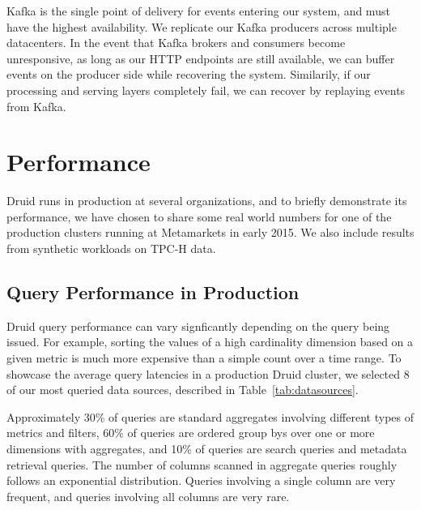 \documentclass{vldb}
\begin{document}
Kafka is the single point of delivery for events entering our system, and must
have the highest availability. We replicate our Kafka producers across multiple
datacenters. In the event that Kafka brokers and consumers become unresponsive,
as long as our HTTP endpoints are still available, we can buffer events on the
producer side while recovering the system. Similarily, if our processing and
serving layers completely fail, we can recover by replaying events from Kafka.

\section{Performance}
\label{sec:performance}
Druid runs in production at several organizations, and to briefly demonstrate
its performance, we have chosen to share some real world numbers for one of the
production clusters running at Metamarkets in early 2015. We also include
results from synthetic workloads on TPC-H data.

\subsection{Query Performance in Production}
Druid query performance can vary signficantly depending on the query being
issued. For example, sorting the values of a high cardinality dimension based
on a given metric is much more expensive than a simple count over a time range.
To showcase the average query latencies in a production Druid cluster, we
selected 8 of our most queried data sources, described in
Table~\ref{tab:datasources}.

Approximately 30\% of queries are standard aggregates involving different types
of metrics and filters, 60\% of queries are ordered group bys over one or more
dimensions with aggregates, and 10\% of queries are search queries and metadata
retrieval queries. The number of columns scanned in aggregate queries roughly
follows an exponential distribution. Queries involving a single column are very
frequent, and queries involving all columns are very rare.
\end{document}

